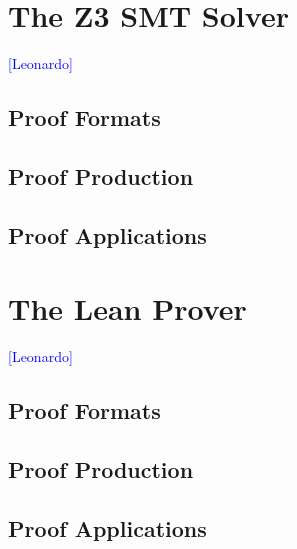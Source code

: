 \documentclass{llncs}
\newcommand{\Note}[1]{\textcolor{blue}{[#1]}}
\begin{document}
\section{The Z3 SMT Solver}
\Note{Leonardo}
\subsection{Proof Formats}
\subsection{Proof Production}
\subsection{Proof Applications}

\section{The Lean Prover}
\Note{Leonardo}
\subsection{Proof Formats}
\subsection{Proof Production}
\subsection{Proof Applications}






\end{document}
